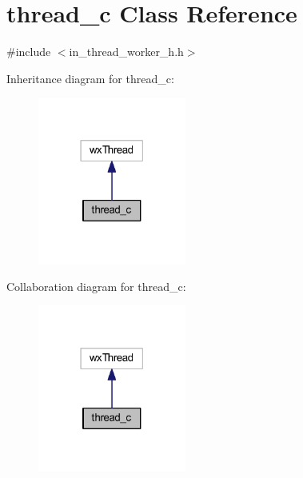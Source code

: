 \section{thread\+\_\+c Class Reference}
\label{classthread__c}


{\ttfamily \#include $<$in\+\_\+thread\+\_\+worker\+\_\+h.\+h$>$}



Inheritance diagram for thread\+\_\+c\+:
\nopagebreak
\begin{figure}[H]
\begin{center}
\leavevmode
\includegraphics[width=138pt]{classthread__c__inherit__graph}
\end{center}
\end{figure}


Collaboration diagram for thread\+\_\+c\+:
\nopagebreak
\begin{figure}[H]
\begin{center}
\leavevmode
\includegraphics[width=138pt]{classthread__c__coll__graph}
\end{center}
\end{figure}
